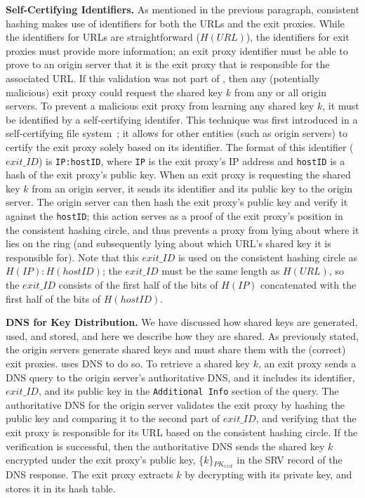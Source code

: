 \textbf{Self-Certifying Identifiers.}
As mentioned in the previous paragraph, consistent hashing makes use of identifiers for both the URLs and 
the exit proxies.  While the identifiers for URLs are straightforward ($H(URL)$), the identifiers for exit 
proxies must provide more information; an exit proxy identifier must be able to prove to an origin server that 
it is the exit proxy that is responsible for the associated URL.  If this validation was not part of \system{}, 
then any (potentially malicious) exit proxy could request the shared key $k$ from any or all origin servers.  To 
prevent a malicious exit proxy from learning any shared key $k$, it must be identified by a self-certifying 
identifer.  This technique was first introduced in a self-certifying file system~\cite{mazieres2000self}; it allows
for other entities (such as origin servers) to certify the exit proxy solely based on its identifier.  The format 
of this identifier ($exit\_ID$) is {\tt IP:hostID}, where {\tt IP} is the exit proxy's IP address and {\tt hostID} 
is a hash of the exit proxy's public key.  When an exit proxy is requesting the shared key $k$ from an origin server, 
it sends its identifier and its public key to the origin server.  The origin server
can then hash the exit proxy's 
public key and verify it against the {\tt hostID}; this action serves as a proof
of the exit proxy's position in the consistent hashing
circle, and thus prevents a proxy from lying about where it lies on the ring (and subsequently lying about which 
URL's shared key it is responsible for).  Note that this $exit\_ID$ is used on the consistent hashing circle as $H(IP):H(hostID)$; the 
$exit\_ID$ must be the same length as $H(URL)$, so the $exit\_ID$ consists of the first half of the bits of $H(IP)$ concatenated 
with the first half of the bits of $H(hostID)$.

\textbf{DNS for Key Distribution.}
We have discussed how shared keys are generated, used, and stored, and here we describe how they are shared.  As previously 
stated, the origin servers generate shared keys and must share them with the (correct) exit proxies.  \system{} uses DNS
to do so.  To retrieve a shared key $k$, an exit proxy sends a DNS query to the origin server's authoritative DNS, and 
it includes its identifier, $exit\_ID$, and its public key in the {\tt Additional Info} section of the query.  The 
authoritative DNS for the origin server validates the exit proxy by hashing the public key and comparing it to the 
second part of $exit\_ID$, and verifying that the exit proxy is responsible for its URL based on the consistent 
hashing circle.  If the verification is successful, then the authoritative DNS sends the shared key $k$ encrypted 
under the exit proxy's public key, \{$k$\}$_{PK_{exit}}$ in the SRV record of the DNS response.  The exit proxy 
extracts $k$ by decrypting with its private key, and stores it in its hash table.

